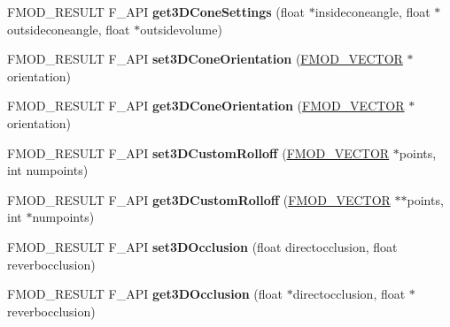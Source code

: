 \begin{DoxyCompactItemize}
\item 
\hypertarget{class_f_m_o_d_1_1_channel_a7206e7b2353ed27ec91512690bd2c052}{F\-M\-O\-D\-\_\-\-R\-E\-S\-U\-L\-T F\-\_\-\-A\-P\-I {\bfseries get3\-D\-Cone\-Settings} (float $\ast$insideconeangle, float $\ast$outsideconeangle, float $\ast$outsidevolume)}\label{class_f_m_o_d_1_1_channel_a7206e7b2353ed27ec91512690bd2c052}

\item 
\hypertarget{class_f_m_o_d_1_1_channel_a6c10b3cdb50cb11d5090b14b7f569a79}{F\-M\-O\-D\-\_\-\-R\-E\-S\-U\-L\-T F\-\_\-\-A\-P\-I {\bfseries set3\-D\-Cone\-Orientation} (\hyperlink{struct_f_m_o_d___v_e_c_t_o_r}{F\-M\-O\-D\-\_\-\-V\-E\-C\-T\-O\-R} $\ast$orientation)}\label{class_f_m_o_d_1_1_channel_a6c10b3cdb50cb11d5090b14b7f569a79}

\item 
\hypertarget{class_f_m_o_d_1_1_channel_a0f22cabb2a93d1a8c038293c9a5a970d}{F\-M\-O\-D\-\_\-\-R\-E\-S\-U\-L\-T F\-\_\-\-A\-P\-I {\bfseries get3\-D\-Cone\-Orientation} (\hyperlink{struct_f_m_o_d___v_e_c_t_o_r}{F\-M\-O\-D\-\_\-\-V\-E\-C\-T\-O\-R} $\ast$orientation)}\label{class_f_m_o_d_1_1_channel_a0f22cabb2a93d1a8c038293c9a5a970d}

\item 
\hypertarget{class_f_m_o_d_1_1_channel_a1ad33a178f33decfc764dfca2ad0aefb}{F\-M\-O\-D\-\_\-\-R\-E\-S\-U\-L\-T F\-\_\-\-A\-P\-I {\bfseries set3\-D\-Custom\-Rolloff} (\hyperlink{struct_f_m_o_d___v_e_c_t_o_r}{F\-M\-O\-D\-\_\-\-V\-E\-C\-T\-O\-R} $\ast$points, int numpoints)}\label{class_f_m_o_d_1_1_channel_a1ad33a178f33decfc764dfca2ad0aefb}

\item 
\hypertarget{class_f_m_o_d_1_1_channel_ae772d709160da9adb23971c6f0b2bc33}{F\-M\-O\-D\-\_\-\-R\-E\-S\-U\-L\-T F\-\_\-\-A\-P\-I {\bfseries get3\-D\-Custom\-Rolloff} (\hyperlink{struct_f_m_o_d___v_e_c_t_o_r}{F\-M\-O\-D\-\_\-\-V\-E\-C\-T\-O\-R} $\ast$$\ast$points, int $\ast$numpoints)}\label{class_f_m_o_d_1_1_channel_ae772d709160da9adb23971c6f0b2bc33}

\item 
\hypertarget{class_f_m_o_d_1_1_channel_a0037d4f48e07686f53d35c66fd6be5cd}{F\-M\-O\-D\-\_\-\-R\-E\-S\-U\-L\-T F\-\_\-\-A\-P\-I {\bfseries set3\-D\-Occlusion} (float directocclusion, float reverbocclusion)}\label{class_f_m_o_d_1_1_channel_a0037d4f48e07686f53d35c66fd6be5cd}

\item 
\hypertarget{class_f_m_o_d_1_1_channel_a0059b3132df76efd24f8567b4fcf4818}{F\-M\-O\-D\-\_\-\-R\-E\-S\-U\-L\-T F\-\_\-\-A\-P\-I {\bfseries get3\-D\-Occlusion} (float $\ast$directocclusion, float $\ast$reverbocclusion)}\label{class_f_m_o_d_1_1_channel_a0059b3132df76efd24f8567b4fcf4818}


\end{DoxyCompactItemize}
